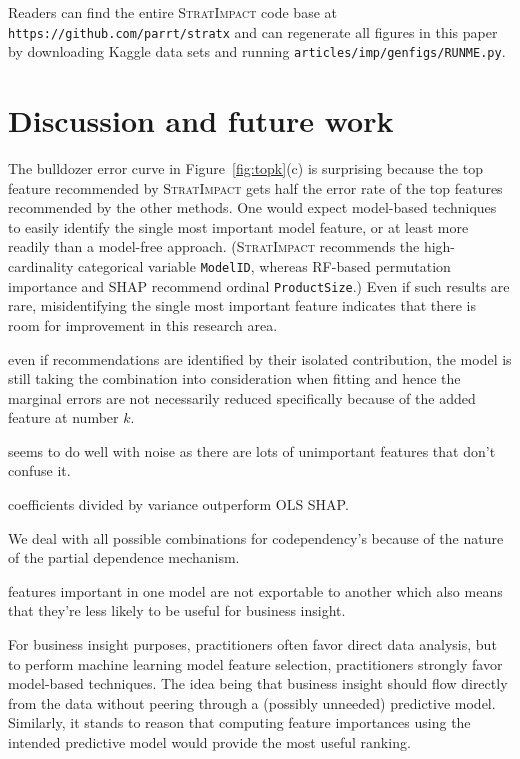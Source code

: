\documentclass[11pt]{article}
\newcommand{\figref}[1]{Figure~\ref{#1}}
\newcommand{\todo}[1]{{{\color{red}{[#1]}}}}
\newcommand{\simp}{\fontfamily{cmr}\textsc{\small StratImpact}}
\begin{document}
Readers can find the entire \simp{} code base at {\tt\small https://github.com/parrt/stratx} and can regenerate all figures in this paper by downloading Kaggle data sets and running {\tt\small articles/imp/genfigs/RUNME.py}.

\section{Discussion and future work}

The bulldozer error curve in \figref{fig:topk}(c) is surprising because the top feature recommended by \simp{} gets half the error rate of the top features recommended by the other methods. One would expect model-based techniques to easily identify the single most important model feature, or at least more readily than a model-free approach.  (\simp{} recommends the high-cardinality categorical variable {\tt ModelID}, whereas RF-based permutation importance and SHAP recommend ordinal {\tt ProductSize}.)  Even if such results are rare, misidentifying the single most important feature indicates that there is room for improvement in this research area.

even if recommendations are identified by their isolated contribution, the model is still taking the combination into consideration when fitting and hence the marginal errors are not necessarily reduced specifically because of the added feature at number $k$.

seems to do well with noise as there are lots of unimportant features that don't confuse it.

coefficients divided by variance outperform OLS SHAP.

\todo{We need min samples per x to avoid left edge issues as they skew entire pdp, which severely skews mass AUC.}

We deal with all possible combinations for codependency's because of the nature of the partial dependence mechanism.

features important in one model are not exportable to another which also means that they're less likely to be useful for business insight.
 
For business insight purposes, practitioners often favor direct data analysis, but to perform machine learning model feature selection, practitioners strongly favor model-based techniques. The idea being that business insight should flow directly from the data without peering through a (possibly unneeded) predictive model.  Similarly, it stands to reason that computing feature importances using the intended predictive model would provide the most useful ranking.
\end{document}
